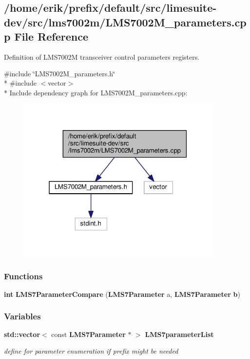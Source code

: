 \subsection{/home/erik/prefix/default/src/limesuite-\/dev/src/lms7002m/\+L\+M\+S7002\+M\+\_\+parameters.cpp File Reference}
\label{LMS7002M__parameters_8cpp}


Definition of L\+M\+S7002M transceiver control parameters registers.  


{\ttfamily \#include \char`\"{}L\+M\+S7002\+M\+\_\+parameters.\+h\char`\"{}}\\*
{\ttfamily \#include $<$vector$>$}\\*
Include dependency graph for L\+M\+S7002\+M\+\_\+parameters.\+cpp\+:
\nopagebreak
\begin{figure}[H]
\begin{center}
\leavevmode
\includegraphics[width=291pt]{de/d3a/LMS7002M__parameters_8cpp__incl}
\end{center}
\end{figure}
\subsubsection*{Functions}
\begin{DoxyCompactItemize}
\item 
{\bf int} {\bf L\+M\+S7\+Parameter\+Compare} ({\bf L\+M\+S7\+Parameter} a, {\bf L\+M\+S7\+Parameter} {\bf b})
\end{DoxyCompactItemize}
\subsubsection*{Variables}
\begin{DoxyCompactItemize}
\item 
{\bf std\+::vector}$<$ const {\bf L\+M\+S7\+Parameter} $\ast$ $>$ {\bf L\+M\+S7parameter\+List}
\begin{DoxyCompactList}\small\item\em define for parameter enumeration if prefix might be needed \end{DoxyCompactList}\end{DoxyCompactItemize}


